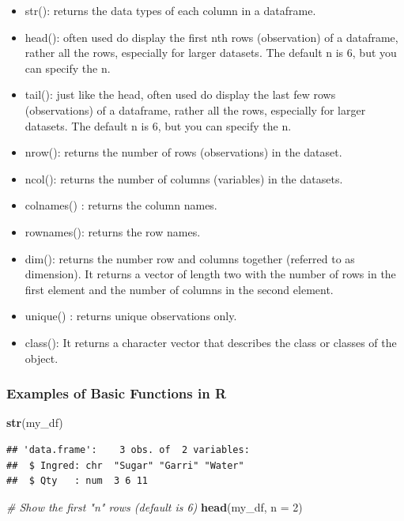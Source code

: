 \documentclass[
]{article}
\newenvironment{Shaded}{\begin{snugshade}}{\end{snugshade}}
\newcommand{\AttributeTok}[1]{\textcolor[rgb]{0.13,0.29,0.53}{#1}}
\newcommand{\CommentTok}[1]{\textcolor[rgb]{0.56,0.35,0.01}{\textit{#1}}}
\newcommand{\DecValTok}[1]{\textcolor[rgb]{0.00,0.00,0.81}{#1}}
\newcommand{\FunctionTok}[1]{\textcolor[rgb]{0.13,0.29,0.53}{\textbf{#1}}}
\newcommand{\NormalTok}[1]{#1}
\begin{document}
\begin{itemize}
\item
  str(): returns the data types of each column in a dataframe.
\item
  head(): often used do display the first nth rows (observation) of a
  dataframe, rather all the rows, especially for larger datasets. The
  default n is 6, but you can specify the n.
\item
  tail(): just like the head, often used do display the last few rows
  (observations) of a dataframe, rather all the rows, especially for
  larger datasets. The default n is 6, but you can specify the n.
\item
  nrow(): returns the number of rows (observations) in the dataset.
\item
  ncol(): returns the number of columns (variables) in the datasets.
\item
  colnames() : returns the column names.
\item
  rownames(): returns the row names.
\item
  dim(): returns the number row and columns together (referred to as
  dimension). It returns a vector of length two with the number of rows
  in the first element and the number of columns in the second element.
\item
  unique() : returns unique observations only.
\item
  class(): It returns a character vector that describes the class or
  classes of the object.
\end{itemize}

\hypertarget{examples-of-basic-functions-in-r}{%
\subsubsection{Examples of Basic Functions in
R}\label{examples-of-basic-functions-in-r}}

\begin{Shaded}
\begin{Highlighting}[]
\FunctionTok{str}\NormalTok{(my\_df)}
\end{Highlighting}
\end{Shaded}

\begin{verbatim}
## 'data.frame':    3 obs. of  2 variables:
##  $ Ingred: chr  "Sugar" "Garri" "Water"
##  $ Qty   : num  3 6 11
\end{verbatim}

\begin{Shaded}
\begin{Highlighting}[]
\CommentTok{\# Show the first "n" rows (default is 6)}
\FunctionTok{head}\NormalTok{(my\_df, }\AttributeTok{n =} \DecValTok{2}\NormalTok{)}
\end{Highlighting}
\end{Shaded}
\end{document}
